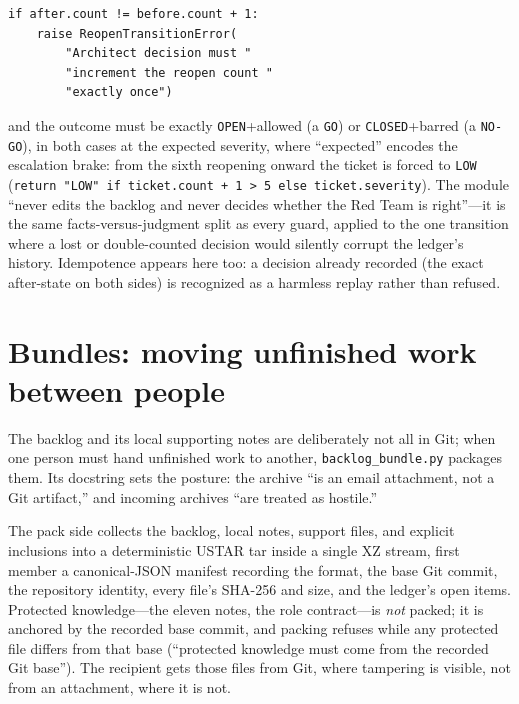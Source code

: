 \documentclass[10pt,aps,prd,twocolumn,nofootinbib]{revtex4-2}
\newcommand{\code}[1]{\texttt{#1}}
\newcommand{\file}[1]{\texttt{#1}}
\begin{document}
\begin{verbatim}
if after.count != before.count + 1:
    raise ReopenTransitionError(
        "Architect decision must "
        "increment the reopen count "
        "exactly once")
\end{verbatim}

\noindent and the outcome must be exactly \code{OPEN}+allowed
(a \code{GO}) or \code{CLOSED}+barred (a \code{NO-GO}), in both cases
at the expected severity, where ``expected'' encodes the escalation
brake: from the sixth reopening onward the ticket is forced to
\code{LOW} (\code{return "LOW" if ticket.count + 1 > 5 else
ticket.severity}).  The module ``never edits the backlog and never
decides whether the Red Team is right''---it is the same
facts-versus-judgment split as every guard, applied to the one
transition where a lost or double-counted decision would silently
corrupt the ledger's history.  Idempotence appears here too: a
decision already recorded (the exact after-state on both sides) is
recognized as a harmless replay rather than refused.

\section{Bundles: moving unfinished work between people}
\label{sec:bundles}

The backlog and its local supporting notes are deliberately not all in
Git; when one person must hand unfinished work to another,
\file{backlog\_bundle.py} packages them.  Its docstring sets the
posture: the archive ``is an email attachment, not a Git artifact,''
and incoming archives ``are treated as hostile.''

The pack side collects the backlog, local notes, support files, and
explicit inclusions into a deterministic USTAR tar inside a single XZ
stream, first member a canonical-JSON manifest recording the format,
the base Git commit, the repository identity, every file's SHA-256 and
size, and the ledger's open items.  Protected knowledge---the eleven
notes, the role contract---is \emph{not} packed; it is anchored by
the recorded base commit, and packing refuses while any protected file
differs from that base (``protected knowledge must come from the
recorded Git base'').  The recipient gets those files from Git, where
tampering is visible, not from an attachment, where it is not.
\end{document}
